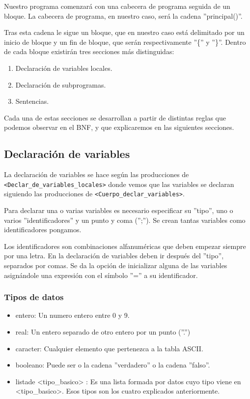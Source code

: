\documentclass[12pt, spanish]{article}
\begin{document}
Nuestro programa comenzará con una cabecera de programa seguida de un bloque. La cabecera de programa, en nuestro caso, será la cadena ''principal()''.

Tras esta cadena le sigue un bloque, que en nuestro caso está delimitado por un inicio de bloque y un fin de bloque, que serán respectivamente ''\{'' y ''\}''. Dentro de cada bloque existirán tres secciones más distinguidas:

\begin{enumerate}
	\item Declaración de variables locales.
	\item Declaración de subprogramas.
	\item Sentencias.
\end{enumerate}

Cada una de estas secciones se desarrollan a partir de distintas reglas que podemos observar en el BNF, y que explicaremos en las siguientes secciones.

\subsection{Declaración de variables}

La declaración de variables se hace según las producciones de \texttt{<Declar_de_variables_locales>} donde vemos que las variables se declaran siguiendo las producciones de \texttt{<Cuerpo_declar_variables>}.


Para declarar una o varias variables es necesario especificar su ''tipo'', uno o varios ''identificadores'' y un punto y coma ('';''). Se crean tantas variables como identificadores pongamos.


Los identificadores son combinaciones alfanuméricas que deben empezar siempre por una letra. En la declaración de variables deben ir después del ''tipo'', separados por comas. Se da la opción de inicializar alguna de las variables asignándole una expresión con el símbolo ''='' a su identificador.

\subsubsection{Tipos de datos}

\begin{itemize}

	\item entero: Un numero entero entre 0 y 9.
	\item real: Un entero separado de otro entero por un punto (''.'')
	\item caracter: Cualquier elemento que pertenezca a la tabla ASCII.
	\item booleano: Puede ser o la cadena ''verdadero'' o la cadena ''falso''.
	\item listade <tipo_basico> : Es una lista formada por datos cuyo tipo viene en <tipo_basico>. Esos tipos son los cuatro explicados anteriormente.
\end{itemize}
\end{document}
